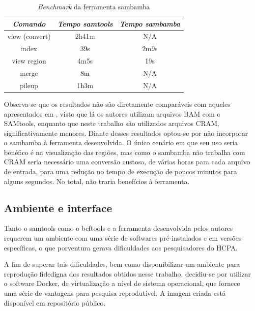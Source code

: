 \documentclass[cic,tc]{iiufrgs}
\begin{document}
\begin{table}[h]
  \caption{\textit{Benchmark} da ferramenta sambamba}
    \centering
        \begin{tabular}{c|c|c}
          \hline
          \textit{Comando}  &   \textit{Tempo samtools}  & \textit{Tempo sambamba} \\
          \hline
          \hline
          view (convert) & 2h41m & N/A \\
          index & 39s & 2m9s \\
          view region & 4m5s & 19s \\
          merge & 8m & N/A \\
          pileup & 1h3m & N/A \\
          \hline
        \end{tabular}
    \label{tbl:sambamba}
\end{table}

Observa-se que os resultados não são diretamente comparáveis com aqueles
apresentados em \cite{tarasov2015sambamba}, visto que lá os autores utilizam
arquivos BAM com o SAMtools, enquanto que neste trabalho são utilizados
arquivos CRAM, significativamente menores. Diante desses resultados optou-se
por não incorporar o sambamba à ferramenta desenvolvida. O único cenário em que
seu uso seria benéfico é na visualização das regiões, mas como o sambamba não
trabalha com CRAM seria necessário uma conversão custosa, de várias horas para
cada arquivo de entrada, para uma redução no tempo de execução de poucos
minutos para alguns segundos. No total, não traria benefícios à ferramenta.

\subsection{Ambiente e interface}

Tanto o samtools como o bcftools e a ferramenta desenvolvida pelos autores
requerem um ambiente com uma série de softwares pré-instalados e em versões
específicas, o que porventura gerava dificuldades aos pesquisadores do HCPA.

A fim de superar tais dificuldades, bem como disponibilizar um ambiente para
reprodução fidedigna dos resultados obtidos nesse trabalho, decidiu-se por
utilizar o software Docker, de virtualização a nível de sistema operacional,
que fornece uma série de vantagens para pesquisa
reprodutível.\cite{boettiger2015introduction} A imagem criada está disponível
em repositório público.\cite{dockerme}
\end{document}
